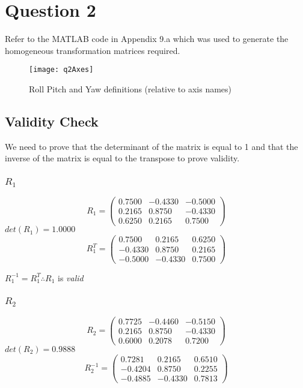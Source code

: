 \section{Question 2}
	Refer to the MATLAB code in Appendix 9.a which was used to generate the homogeneous transformation matrices required.\\

	\begin{figure}[position = here]
		\begin{centering}
		\texttt{[image: q2Axes]}
		\caption[\textit{RPYAxes}]{Roll Pitch and Yaw definitions (relative to axis names)}
		\end{centering}
	\end{figure}
	
	\subsection{Validity Check}
	We need to prove that the determinant of the matrix is equal to 1 and that the inverse of the matrix is equal to the transpose to prove validity.
		\subsubsection{$R_{1}$}
			$$
			R_{1} =
			\begin{pmatrix}
			0.7500 & -0.4330 & -0.5000\\
			0.2165 & 0.8750 & -0.4330\\
			0.6250  & 0.2165  & 0.7500
			\end{pmatrix}
			$$
			\hspace{35mm}$det(R_{1}) = 1.0000$
			\\
			$$
			R_{1}^{T} =
			\begin{pmatrix}
				0.7500 & 0.2165 & 0.6250\\
				-0.4330 & 0.8750 & 0.2165\\
				-0.5000  & -0.4330  & 0.7500
			\end{pmatrix}
			$$
			
			\hspace{30mm}$R_{1}^{-1} = R_{1}^{T}\therefore R_{1}$ is \emph{valid}
			
		\pagebreak
		\subsubsection{$R_{2}$}
			$$
			R_{2} =
			\begin{pmatrix}
				0.7725 & -0.4460 & -0.5150\\
				0.2165 & 0.8750 & -0.4330\\
				0.6000  & 0.2078  & 0.7200
			\end{pmatrix}
			$$
			\hspace{35mm}$det(R_{2}) = 0.9888$
			\\
			$$
			R_{2}^{-1} =
			\begin{pmatrix}
				0.7281 & 0.2165 & 0.6510\\
				-0.4204 & 0.8750 & 0.2255\\
				-0.4885  & -0.4330  & 0.7813
			\end{pmatrix}
			$$
					
